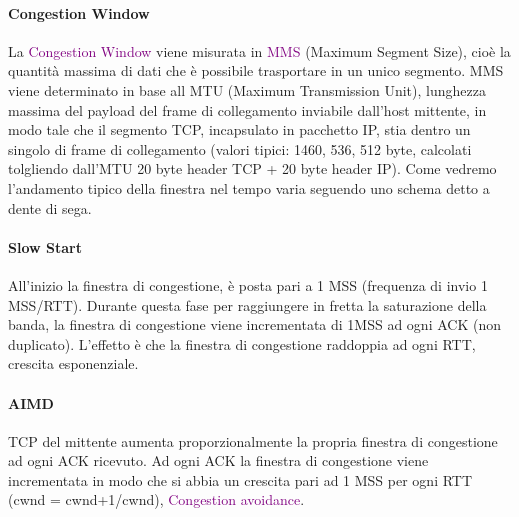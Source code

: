 \paragraph{Congestion Window}
La \textcolor{purple}{Congestion Window} viene misurata in \textcolor{purple}{MMS} (Maximum Segment Size), cioè la quantità massima di dati che è possibile trasportare in un unico segmento.
MMS viene determinato in base all MTU (Maximum Transmission Unit), lunghezza massima del payload del frame di collegamento inviabile dall’host mittente, in modo tale che il segmento TCP, incapsulato in pacchetto IP, stia dentro un singolo di frame di collegamento (valori tipici: 1460, 536, 512 byte, calcolati tolgliendo dall’MTU 20 byte header TCP + 20 byte header IP).
Come vedremo l'andamento tipico della finestra nel tempo varia seguendo uno schema detto a dente di sega.

\paragraph{Slow Start}
All'inizio la finestra di congestione, è posta pari a 1 MSS (frequenza di invio 1 MSS/RTT). 
Durante questa fase per raggiungere in fretta la saturazione della banda, la finestra di congestione viene incrementata di 1MSS ad ogni ACK (non duplicato).
L’effetto è che la finestra di congestione raddoppia ad ogni RTT, crescita esponenziale.

\paragraph{AIMD}
TCP del mittente aumenta proporzionalmente la propria finestra di congestione ad ogni ACK ricevuto.
Ad ogni ACK la finestra di congestione viene incrementata in modo che si abbia un crescita pari ad 1 MSS per ogni RTT (cwnd = cwnd+1/cwnd), \textcolor{purple}{Congestion avoidance}.

